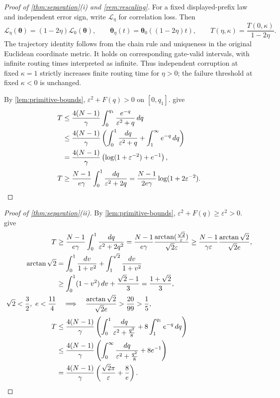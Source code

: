 \begin{proof}[Proof of \cref{thm:separation}(i) and \cref{rem:rescaling}]
For a fixed displayed-prefix law and independent error sign, write $\mathcal L_\eta$ for correlation loss. Then
\[
 \mathcal L_\eta(\bm\theta)=(1-2\eta)\mathcal L_0(\bm\theta),\qquad
 \bm\theta_\eta(t)=\bm\theta_0((1-2\eta)t),\qquad
 T(\eta,\kappa)=\frac{T(0,\kappa)}{1-2\eta}.
\]
The trajectory identity follows from the chain rule and uniqueness in the original Euclidean coordinate metric.
It holds on corresponding gate-valid intervals, with infinite routing times interpreted as infinite.
Thus independent corruption at fixed $\kappa=1$ strictly increases finite routing time for $\eta>0$;
the failure threshold at fixed $\kappa<0$ is unchanged.

By \cref{lem:primitive-bounds}, $\varepsilon^2+F(q)>0$ on $[0,q_1]$.
 give
\begin{align*}
 T
 &\le\frac{4(N-1)}{\gamma}\int_0^{q_1}\frac{e^{-q}}{\varepsilon^2+q}\,dq\\
 &\le\frac{4(N-1)}{\gamma}
 \left(\int_0^1\frac{dq}{\varepsilon^2+q}+\int_1^\infty e^{-q}\,dq\right)\\
 &=\frac{4(N-1)}{\gamma}\left(\log(1+\varepsilon^{-2})+e^{-1}\right),\\[2pt]
 T
 &\ge\frac{N-1}{e\gamma}\int_0^1\frac{dq}{\varepsilon^2+2q}
 =\frac{N-1}{2e\gamma}\log(1+2\varepsilon^{-2}).
\end{align*}
\end{proof}

\begin{proof}[Proof of \cref{thm:separation}(ii)]
By \cref{lem:primitive-bounds}, $\varepsilon^2+F(q)\ge \varepsilon^2>0$.
 give
\begin{align*}
 T
 &\ge\frac{N-1}{e\gamma}\int_0^1\frac{dq}{\varepsilon^2+2q^2}
 =\frac{N-1}{e\gamma}\frac{\arctan(\frac{\sqrt2}{\varepsilon})}{\sqrt2\varepsilon}
 \ge\frac{N-1}{\gamma \varepsilon}\frac{\arctan\sqrt2}{\sqrt2e},\\
 \arctan\sqrt2
 &=\int_0^1\frac{dv}{1+v^2}+\int_1^{\sqrt2}\frac{dv}{1+v^2}\\
 &\ge\int_0^1(1-v^2)\,dv+\frac{\sqrt2-1}{3}=\frac{1+\sqrt2}{3},\\
 \sqrt2<\frac{3}{2},\ e<\frac{11}{4}
 &\quad\Longrightarrow\quad
 \frac{\arctan\sqrt2}{\sqrt2e}>\frac{20}{99}>\frac{1}{5},\\[2pt]
 T
 &\le\frac{4(N-1)}{\gamma}
 \left(\int_0^1\frac{dq}{\varepsilon^2+\frac{q^2}{8}}+8\int_1^{q_1}e^{-q}\,dq\right)\\
 &\le\frac{4(N-1)}{\gamma}
 \left(\int_0^\infty\frac{dq}{\varepsilon^2+\frac{q^2}{8}}+8e^{-1}\right)\\
 &=\frac{4(N-1)}{\gamma}
 \left(\frac{\sqrt2\pi}{\varepsilon}+\frac{8}{e}\right).
\end{align*}
\end{proof}

